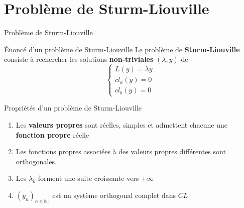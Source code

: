\documentclass[10pt]{beamer}
\begin{document}
\section{Problème de Sturm-Liouville}
\begin{frame}{Problème de Sturm-Liouville}
\begin{alertblock}{Énoncé d'un problème de Sturm-Liouville}
Le problème de \textbf{Sturm-Liouville} consiste à rechercher les solutions \textbf{non-triviales} $(\lambda ,y)$ de 
$$\left\{ \begin{array}{l}
L(y) = \lambda y \\
cl_a(y) = 0 \\
cl_b(y) = 0
\end{array} \right.$$

\end{alertblock}
\begin{block}{Propriétés d'un problème de Sturm-Liouville}
\begin{enumerate}
\item Les \textbf{valeurs propres} sont réelles, simples et admettent chacune une \textbf{fonction propre} réelle
\item Les fonctions propres associées à des valeurs propres différentes sont orthogonales.
\item Les $\lambda_k$ forment une suite croissante vers $+\infty$
\item $(y_n)_{n\in\mathbb{N}_0}$ est un système orthogonal complet dans $CL$
\end{enumerate}

\end{block}
\end{frame}
\end{document}
